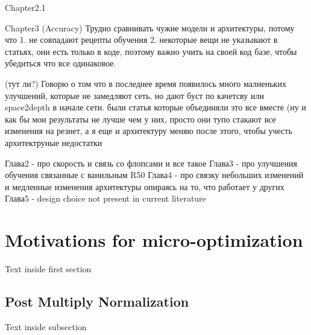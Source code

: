 Chapter2.1


Chapter3 (Accuracy)
Трудно сравнивать чужие модели и архитектуры, потому что 1. не совпадают рецепты обучения 2. некоторые вещи не указывают в статьях, они есть только в коде, поэтому важно учить на своей код базе, чтобы убедиться что все одинаковое. 

(тут ли?)
Говорю о том что в последнее время появилось много малненьких улучшений, которые не замедляют сеть, но дают буст по качетсву \cite{zhang2019making_aa_shift_invariant} или space2depth  \cite{ridnik2021_tresnet} в начале сети. были статья которые объединяли это все вместе \cite{lee2020compounding_improvements} \cite{bello2021revisiting_resnet} (ну и как бы мои результаты не лучше чем у них, просто они тупо стакают все изменения на резнет, а я еще и архитектуру меняю после этого, чтобы учесть архитектруные недостатки


Глава2 - про скорость и связь со флопсами и все такое
Глава3 - про улучшения обучения связанные с ванильным R50
Глава4 - про связку небольших изменений и медленные изменения архитектуры опираясь на то, что работает у других
Глава5 - design choice not present in current literature


\section{Motivations for micro-optimization}

Text inside first section

\subsection{Post Multiply Normalization}

Text inside subsection
